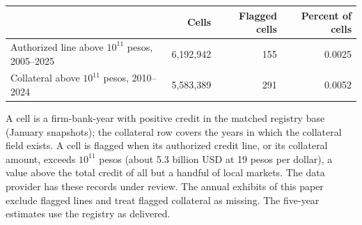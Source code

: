 \begin{threeparttable}
    \begin{tabular}{@{}lrrr@{}}
        \toprule
         & Cells & Flagged cells & Percent of cells \\
        \midrule
        Authorized line above $10^{11}$ pesos, 2005--2025 & 6,192,942 & 155 & 0.0025 \\
        Collateral above $10^{11}$ pesos, 2010--2024 & 5,583,389 & 291 & 0.0052 \\
        \bottomrule
    \end{tabular}
    \begin{tablenotes}[flushleft]
        \footnotesize
        \item A cell is a firm-bank-year with positive credit in the matched registry base (January snapshots); the collateral row covers the years in which the collateral field exists. A cell is flagged when its authorized credit line, or its collateral amount, exceeds $10^{11}$ pesos (about 5.3 billion USD at 19 pesos per dollar), a value above the total credit of all but a handful of local markets. The data provider has these records under review. The annual exhibits of this paper exclude flagged lines and treat flagged collateral as missing. The five-year estimates use the registry as delivered. %
    \end{tablenotes}
\end{threeparttable}
